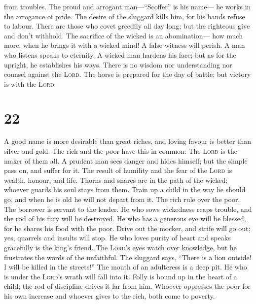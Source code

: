 from troubles.  The proud and arrogant man---``Scoffer''
is his name--- he works in the arrogance of pride.  The
desire of the sluggard kills him, for his hands refuse to labour.
 There are those who covet greedily all day long; but the
righteous give and don't withhold.  The sacrifice of the
wicked is an abomination--- how much more, when he brings it with a
wicked mind!  A false witness will perish. A man who
listens speaks to eternity.  A wicked man hardens his
face; but as for the upright, he establishes his ways. 
There is no wisdom nor understanding nor counsel against the
\textsc{Lord}.  The horse is prepared for the day of
battle; but victory is with the \textsc{Lord}.

\hypertarget{section-21}{%
\section{22}\label{section-21}}

 A good name is more desirable than great riches, and
loving favour is better than silver and gold.  The rich
and the poor have this in common: The \textsc{Lord} is the maker of them
all.  A prudent man sees danger and hides himself; but the
simple pass on, and suffer for it.  The result of humility
and the fear of the \textsc{Lord} is wealth, honour, and life.
 Thorns and snares are in the path of the wicked; whoever
guards his soul stays from them.  Train up a child in the
way he should go, and when he is old he will not depart from it.
 The rich rule over the poor. The borrower is servant to
the lender.  He who sows wickedness reaps trouble, and the
rod of his fury will be destroyed.  He who has a generous
eye will be blessed, for he shares his food with the poor.
 Drive out the mocker, and strife will go out; yes,
quarrels and insults will stop.  He who loves purity of
heart and speaks gracefully is the king's friend.  The
\textsc{Lord}'s eyes watch over knowledge, but he frustrates the words
of the unfaithful.  The sluggard says, ``There is a lion
outside! I will be killed in the streets!''  The mouth of
an adulteress is a deep pit. He who is under the \textsc{Lord}'s wrath
will fall into it.  Folly is bound up in the heart of a
child; the rod of discipline drives it far from him. 
Whoever oppresses the poor for his own increase and whoever gives to the
rich, both come to poverty.

